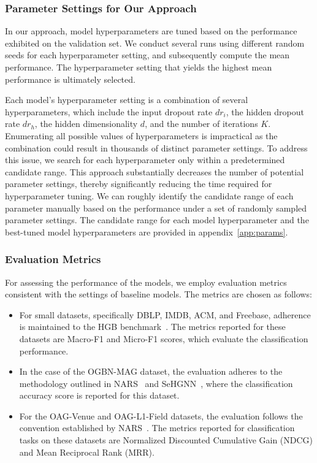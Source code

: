 \documentclass[lettersize,journal]{IEEEtran}
\begin{document}
\subsubsection{Parameter Settings for Our Approach}

In our approach, model hyperparameters are tuned based on the performance exhibited on the validation set. 
We conduct several runs using different random seeds for each hyperparameter setting, and subsequently compute the mean performance. 
The hyperparameter setting that yields the highest mean performance is ultimately selected.


Each model's hyperparameter setting is a combination of several hyperparameters, which include the input dropout rate $dr_i$, the hidden dropout rate $dr_h$, the hidden dimensionality $d$, and the number of iterations $K$.
Enumerating all possible values of hyperparameters is impractical as the combination could result in thousands of distinct parameter settings.
To address this issue, we search for each hyperparameter only within a predetermined candidate range. 
This approach substantially decreases the number of potential parameter settings, thereby significantly reducing the time required for hyperparameter tuning.
We can roughly identify the candidate range of each parameter manually based on the performance under a set of randomly sampled parameter settings.
The candidate range for each model hyperparameter and the best-tuned model hyperparameters are provided in appendix~\ref{app:params}. 









\subsubsection{Evaluation Metrics}

For assessing the performance of the models, we employ evaluation metrics consistent with the settings of baseline models. 
The metrics are chosen as follows:
\begin{itemize}
\item For small datasets, specifically DBLP, IMDB, ACM, and Freebase, adherence is maintained to the HGB benchmark~\cite{DBLP:conf/kdd/LvDLCFHZJDT21}. 
The metrics reported for these datasets are Macro-F1 and Micro-F1 scores, which evaluate the classification performance.
\item In the case of the OGBN-MAG dataset, the evaluation adheres to the methodology outlined in NARS~\cite{yu2020scalable} and SeHGNN~\cite{yang2022simple}, where the classification accuracy score is reported for this dataset.
\item For the OAG-Venue and OAG-L1-Field datasets, the evaluation follows the convention established by NARS~\cite{yu2020scalable}. 
The metrics reported for classification tasks on these datasets are Normalized Discounted Cumulative Gain (NDCG) and Mean Reciprocal Rank (MRR).
\end{itemize}
\end{document}
